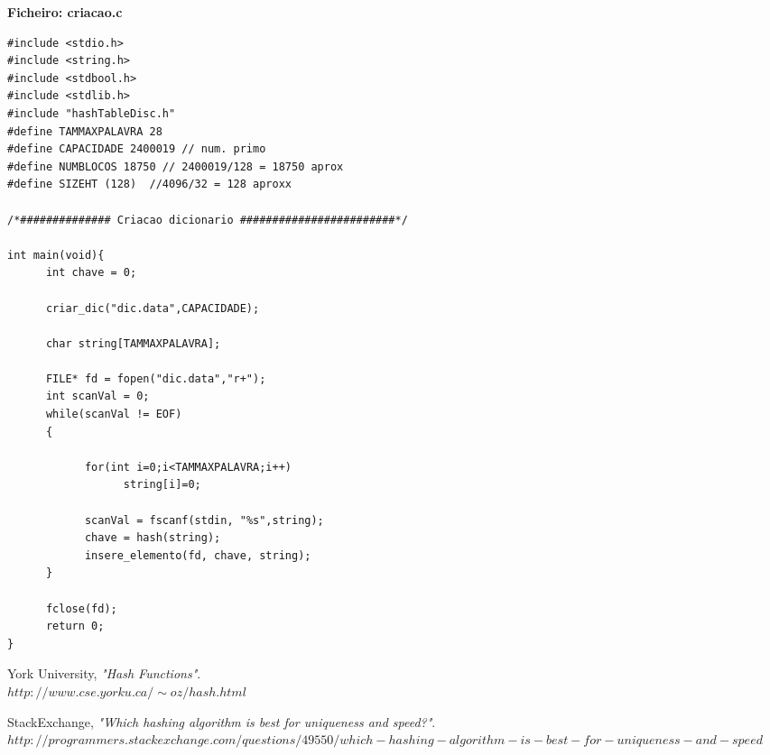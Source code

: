 \textbf{Ficheiro: criacao.c}

\begin{verbatim}
#include <stdio.h>
#include <string.h>
#include <stdbool.h>
#include <stdlib.h>
#include "hashTableDisc.h"
#define TAMMAXPALAVRA 28
#define CAPACIDADE 2400019 // num. primo
#define NUMBLOCOS 18750 // 2400019/128 = 18750 aprox
#define SIZEHT (128)  //4096/32 = 128 aproxx

/*############## Criacao dicionario ########################*/

int main(void){
      int chave = 0;

      criar_dic("dic.data",CAPACIDADE);

      char string[TAMMAXPALAVRA];

      FILE* fd = fopen("dic.data","r+");
      int scanVal = 0;
      while(scanVal != EOF)
      {

            for(int i=0;i<TAMMAXPALAVRA;i++)
                  string[i]=0;

            scanVal = fscanf(stdin, "%s",string);
            chave = hash(string);
            insere_elemento(fd, chave, string);		
      }

      fclose(fd);
      return 0;
}
\end{verbatim}




\begin{thebibliography}{9}
  
  York University,
  \emph{"Hash Functions"}. \\$http://www.cse.yorku.ca/\sim oz/hash.html$

  StackExchange,
  \emph{"Which hashing algorithm is best for uniqueness and speed?"}. $http://programmers.stackexchange.com/questions/49550/which-hashing-algorithm-is-best-for-uniqueness-and-speed$

\end{thebibliography}


